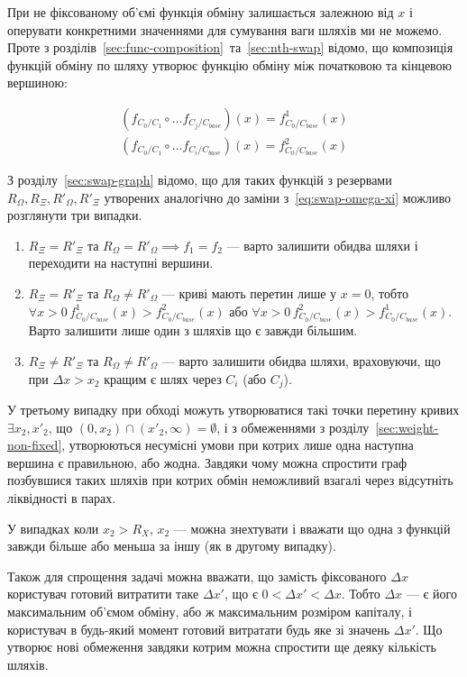 \documentclass[../index.tex]{subfiles}
\begin{document}
При не фіксованому об'ємі функція обміну залишається залежною від $x$ і
оперувати конкретними значеннями для сумування ваги шляхів ми не можемо. Проте з
розділів~\ref{sec:func-composition}~та~\ref{sec:nth-swap} відомо, що композиція
функцій обміну по шляху утворює функцію обміну між початковою та кінцевою
вершиною:

\begin{equation*}
 \begin{aligned}
   (f_{C_{0}/C_{1}} \circ \ldots f_{C_{j}/C_{base}})(x) = f_{C_{0}/C_{base}}^{1}(x)\\
   (f_{C_{0}/C_{1}} \circ \ldots f_{C_{i}/C_{base}})(x) = f_{C_{0}/C_{base}}^{2}(x)
 \end{aligned}
\end{equation*}

З розділу~\ref{sec:swap-graph} відомо, що для таких функцій з резервами
$R_{\Omega}, R_{\Xi}, R'_{\Omega}, R'_{\Xi}$ утворених аналогічно до заміни
з~\eqref{eq:swap-omega-xi} можливо розглянути три випадки.

\begin{enumerate}
  \item $R_{\Xi} = R'_{\Xi}$ та $R_{\Omega} = R'_{\Omega} \implies f_{1} = f_{2}$ --- варто
		залишити обидва шляхи і переходити на наступні вершини.
  \item $R_{\Xi} = R'_{\Xi}$ та $R_{\Omega} \neq R'_{\Omega}$ --- криві мають перетин лише у
		$x = 0$, тобто
		$\forall x > 0 \, f_{C_{0}/C_{base}}^{1}(x) > f_{C_{0}/C_{base}}^{2}(x)$ або
		$\forall x > 0 \, f_{C_{0}/C_{base}}^{2}(x) > f_{C_{0}/C_{base}}^{1}(x)$. Варто
		залишити лише один з шляхів що є завжди більшим.
  \item $R_{\Xi} \neq R'_{\Xi}$ та $R_{\Omega} \neq R'_{\Omega}$ --- варто залишити обидва шляхи,
		враховуючи, що при $\Delta x > x_{2}$ кращим є шлях через $C_{i}$ (або
		$C_{j}$).
\end{enumerate}

У третьому випадку при обході можуть утворюватися такі точки перетину кривих
$\exists x_{2}, x'_{2}$, що $\left(0, x_{2}\right) \cap{} \left(x'_{2}, \infty{} \right) = \emptyset$,
і з обмеженнями з розділу~\ref{sec:weight-non-fixed}, утворюються несумісні
умови при котрих лише одна наступна вершина є правильною, або жодна. Завдяки
чому можна спростити граф позбувшися таких шляхів при котрих обмін неможливий
взагалі через відсутніть ліквідності в парах.

У випадках коли $x_{2} > R_{X}$, $x_{2}$ --- можна знехтувати і вважати що одна з
функцій завжди більше або меньша за іншу (як в другому випадку).

Також для спрощення задачі можна вважати, що замість фіксованого $\Delta x$
користувач готовий витратити таке $\Delta x'$, що є $0 < \Delta x' < \Delta x$. Тобто $\Delta x$ --- є
його максимальним об'ємом обміну, або ж максимальним розміром капіталу, і
користувач в будь-який момент готовий витратати будь яке зі значень $\Delta x'$. Що
утворює нові обмеження завдяки котрим можна спростити ще деяку кількість шляхів.
\end{document}
